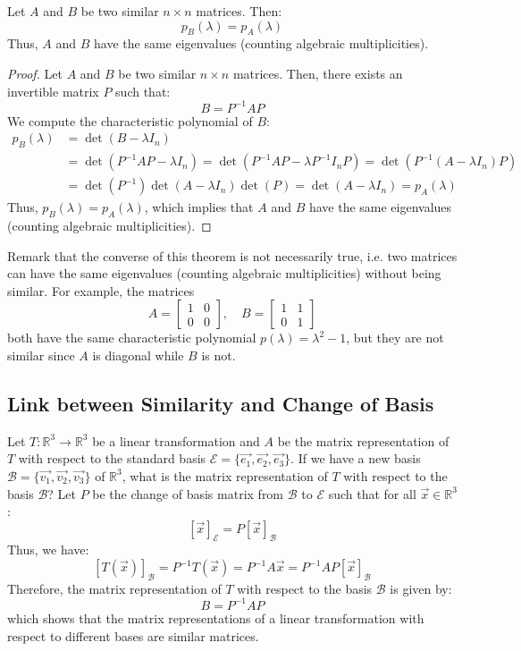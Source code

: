 \begin{theorem}
    Let $A$ and $B$ be two similar $n \times n$ matrices. Then:
    \[
        p_B(\lambda) = p_A(\lambda)
    \]
    Thus, $A$ and $B$ have the same eigenvalues (counting algebraic multiplicities).
\end{theorem}
\begin{proof}
    Let $A$ and $B$ be two similar $n \times n$ matrices. Then, there exists an invertible matrix $P$ such that:
    \[B = P^{-1} A P\]
    We compute the characteristic polynomial of $B$:
    \begin{align*}
        p_B(\lambda) &= \det(B - \lambda I_n) \\
        &= \det(P^{-1} A P - \lambda I_n) = \det(P^{-1} A P - \lambda P^{-1} I_n P) = \det(P^{-1} (A - \lambda I_n) P) \\
        &= \det(P^{-1}) \det(A - \lambda I_n) \det(P) = \det(A - \lambda I_n) = p_A(\lambda)
    \end{align*}
    Thus, $p_B(\lambda) = p_A(\lambda)$, which implies that $A$ and $B$ have the same eigenvalues (counting algebraic multiplicities).
\end{proof}
Remark that the converse of this theorem is not necessarily true, i.e. two matrices can have the same eigenvalues (counting algebraic multiplicities) without being similar. For example, the matrices
\[
A = \begin{bmatrix}
    1 & 0 \\ 0 & 0
\end{bmatrix}, \quad B = \begin{bmatrix}
    1 & 1 \\ 0 & 1
\end{bmatrix}
\]
both have the same characteristic polynomial $p(\lambda) = \lambda^2 - 1$, but they are not similar since $A$ is diagonal while $B$ is not. \\

\subsection{Link between Similarity and Change of Basis}
\begin{eg}
    Let $T: \mathbb{R}^3 \to \mathbb{R}^3$ be a linear transformation and $A$ be the matrix representation of $T$ with respect to the standard basis $\mathcal{E} = \{\vec{e_1}, \vec{e_2}, \vec{e_3}\}$. If we have a new basis $\mathcal{B} = \{\vec{v_1}, \vec{v_2}, \vec{v_3}\}$ of $\mathbb{R}^3$, what is the matrix representation of $T$ with respect to the basis $\mathcal{B}$? Let $P$ be the change of basis matrix from $\mathcal{B}$ to $\mathcal{E}$ such that for all $\vec{x} \in \mathbb{R}^3$:
    \[ [\vec{x}]_{\mathcal{E}} = P [\vec{x}]_{\mathcal{B}} \]
    Thus, we have:
    \[
        [T(\vec{x})]_{\mathcal{B}} = P^{-1} T(\vec{x}) = P^{-1} A \vec{x} = P^{-1} A P [\vec{x}]_{\mathcal{B}} 
    \]
    Therefore, the matrix representation of $T$ with respect to the basis $\mathcal{B}$ is given by:
    \[B = P^{-1} A P\]
    which shows that the matrix representations of a linear transformation with respect to different bases are similar matrices.
\end{eg}

